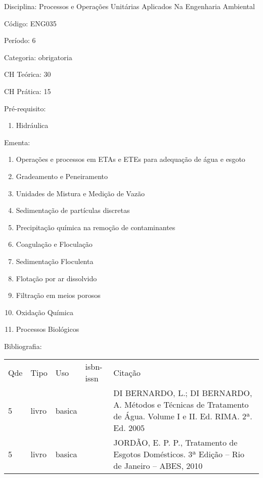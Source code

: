 \documentclass[12pt,a4paper,twoside]{report}
\begin{document}
Disciplina: Processos e Operações Unitárias Aplicados Na Engenharia Ambiental

Código: ENG035

Período: 6

Categoria: obrigatoria

CH Teórica: 30

CH Prática: 15




Pré-requisito:
\begin{enumerate}
\item Hidráulica
\end{enumerate}

Ementa:
\begin{enumerate}
\item Operações e processos em ETAs e ETEs para adequação de água e esgoto
\item Gradeamento e Peneiramento
\item Unidades de Mistura e Medição de Vazão
\item Sedimentação de partículas discretas
\item Precipitação química na remoção de contaminantes
\item Coagulação e Floculação
\item Sedimentação Floculenta
\item Flotação por ar dissolvido
\item Filtração em meios porosos
\item Oxidação Química
\item Processos Biológicos
\end{enumerate}



Bibliografia:


\begin{tabular}{llllp{8cm}}
Qde & Tipo & Uso & isbn-issn & Citação \\
5&livro&basica&&DI BERNARDO, L.; DI BERNARDO, A. Métodos e Técnicas de Tratamento de Água. Volume I e II. Ed. RIMA. 2ª. Ed. 2005\\
5&livro&basica&&JORDÃO, E. P. P., Tratamento de Esgotos Domésticos. 3ª Edição – Rio de Janeiro – ABES, 2010\\
\end{tabular}
\end{document}
